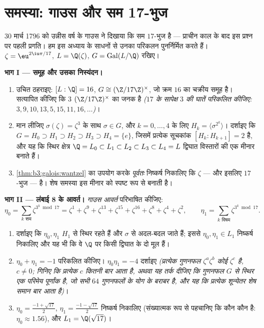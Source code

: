 \section{समस्या: गाउस और सम 17-भुज}

\begin{problem}\label{pb:b3:galois:1}
30 मार्च 1796 को उन्नीस वर्ष के गाउस ने दिखाया कि सम $17$-भुज
 है --- प्राचीन काल के बाद इस प्रश्न पर पहली प्रगति। हम इस
अध्याय के साधनों से उनका परिकलन पुनर्निर्मित करते हैं। $\zeta = \eu^{2\iu\pi/17}$,
$L =
\Q(\zeta)$, $G = \operatorname{Gal}(L/\Q)$ रखिए।

\medskip
\noindent\textbf{भाग I --- समूह और उसका निस्यंदन।}
\begin{enumerate}
  \item उचित ठहराइए: $[L:\Q] = 16$, $G \cong (\Z/17\Z)^\times$, जो क्रम $16$ का चक्रीय
        समूह है। सत्यापित कीजिए कि $3$ $(\Z/17\Z)^\times$ का जनक है
        \emph{($17$ के सापेक्ष $3$ की घातें परिकलित कीजिए:
        $3, 9, 10, 13, 5, 15, 11, 16, \dots$)}।
  \item मान लीजिए $\sigma(\zeta) = \zeta^3$ के साथ $\sigma \in G$, और $k = 0, \dots,
        4$ के लिए $H_k = \langle \sigma^{2^k}\rangle$।
        दर्शाइए कि $G = H_0 \supset H_1 \supset H_2 \supset
        H_3 \supset H_4 = \{e\}$, जिसमें प्रत्येक सूचकांक $[H_k :
        H_{k+1}] = 2$ है,
        और यह कि स्थिर क्षेत्र $\Q = L_0
        \subset L_1 \subset L_2 \subset L_3 \subset L_4 = L$ द्विघात विस्तारों की एक
        मीनार बनाते हैं।
  \item \cref{thm:b3:galois:wantzel} का उपयोग करके \emph{पूर्वतः} निष्कर्ष निकालिए कि
        $\zeta$ --- और इसलिए $17$-भुज ---  है। शेष समस्या
        इस मीनार को स्पष्ट रूप से बनाती है।
\end{enumerate}

\medskip
\noindent\textbf{भाग II --- लंबाई 8 के आवर्त।} \emph{गाउस आवर्त}
परिभाषित कीजिए:
\[
\eta_0 = \sum_{k \text{ सम}} \zeta^{3^k \bmod 17}
= \zeta^{1} + \zeta^{9} + \zeta^{13} + \zeta^{15} + \zeta^{16} +
\zeta^{8} + \zeta^{4} + \zeta^{2},
\qquad
\eta_1 = \sum_{k \text{ विषम}} \zeta^{3^k \bmod 17}.
\]
\begin{enumerate}[resume]
  \item दर्शाइए कि $\eta_0, \eta_1$ $H_1$ से स्थिर रहते हैं और $\sigma$ से
        अदल-बदल जाते हैं; इससे $\eta_0, \eta_1 \in L_1$ निष्कर्ष निकालिए और यह भी
        कि वे $\Q$ पर किसी द्विघात के दो मूल हैं।
  \item $\eta_0 + \eta_1 = -1$ परिकलित कीजिए। $\eta_0\eta_1 = -4$ दर्शाइए \emph{(प्रत्येक
        गुणनफल $\zeta^a\zeta^b$ कोई $\zeta^c$ है, $c \neq 0$; गिनिए कि प्रत्येक
        $c$ कितनी बार आता है, अथवा यह तर्क दीजिए कि गुणनफल
        $G$ से स्थिर एक परिमेय पूर्णांक है, जो सभी $64$
        गुणनफलों के योग के बराबर है, और यह कि प्रत्येक शून्येतर
        शेष समान बार आता है)}।
  \item $\eta_0 = \frac{-1 + \sqrt{17}}2$, $\eta_1 =
        \frac{-1-\sqrt{17}}2$ निष्कर्ष निकालिए (संख्यात्मक रूप से पहचानिए
        कि कौन कौन है: $\eta_0 \approx 1.56$), और $L_1 =
        \Q(\sqrt{17})$।
\end{enumerate}


\end{problem}

